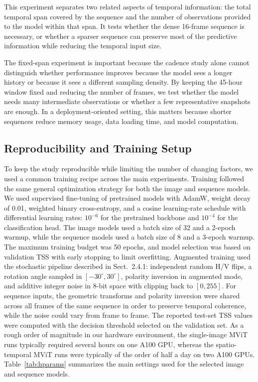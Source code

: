 This experiment separates two related aspects of temporal information: the total temporal span covered by the sequence and the number of observations provided to the model within that span. It tests whether the dense 16-frame sequence is necessary, or whether a sparser sequence can preserve most of the predictive information while reducing the temporal input size.

The fixed-span experiment is important because the cadence study alone cannot distinguish whether performance improves because the model sees a longer history or because it sees a different sampling density. By keeping the 45-hour window fixed and reducing the number of frames, we test whether the model needs many intermediate observations or whether a few representative snapshots are enough. In a deployment-oriented setting, this matters because shorter sequences reduce memory usage, data loading time, and model computation.

\subsection{Reproducibility and Training Setup}
\label{sec:repro}

To keep the study reproducible while limiting the number of changing factors, we used a common training recipe across the main experiments. Training followed the same general optimization strategy for both the image and sequence models. We used supervised fine-tuning of pretrained models with AdamW, weight decay of 0.01, weighted binary cross-entropy, and a cosine learning-rate schedule with differential learning rates: $10^{-6}$ for the pretrained backbone and $10^{-4}$ for the classification head. The image models used a batch size of 32 and a 2-epoch warmup, while the sequence models used a batch size of 8 and a 3-epoch warmup. The maximum training budget was 50 epochs, and model selection was based on validation TSS with early stopping to limit overfitting. Augmented training used the stochastic pipeline described in Sect.~2.4.1: independent random H/V flips, a rotation angle sampled in $[-30^\circ,30^\circ]$, polarity inversion in augmented mode, and additive integer noise in 8-bit space with clipping back to $[0,255]$. For sequence inputs, the geometric transforms and polarity inversion were shared across all frames of the same sequence in order to preserve temporal coherence, while the noise could vary from frame to frame. The reported test-set TSS values were computed with the decision threshold selected on the validation set. As a rough order of magnitude in our hardware environment, the single-image MViT runs typically required several hours on one A100 GPU, whereas the spatio-temporal MViT runs were typically of the order of half a day on two A100 GPUs. Table~\ref{tab:hparams} summarizes the main settings used for the selected image and sequence models.

